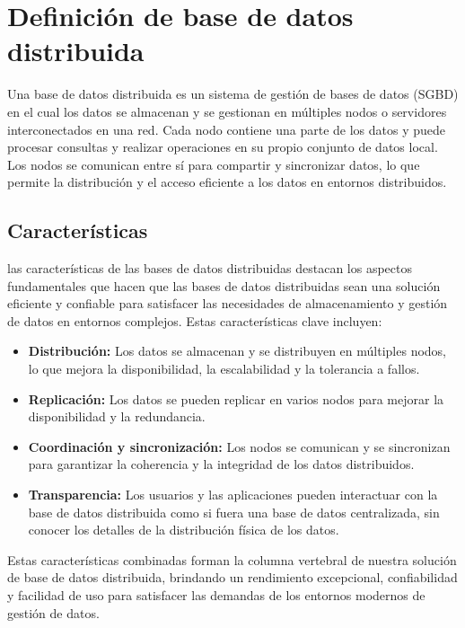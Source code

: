 \section{Definición de base de datos distribuida}
\noindent
Una base de datos distribuida es un sistema de gestión de bases de datos (SGBD) en el cual los datos se almacenan y se gestionan en múltiples nodos o servidores interconectados en una red. Cada nodo contiene una parte de los datos y puede procesar consultas y realizar operaciones en su propio conjunto de datos local. Los nodos se comunican entre sí para compartir y sincronizar datos, lo que permite la distribución y el acceso eficiente a los datos en entornos distribuidos.

\subsection{Características}
\noindent
las características de las bases de datos distribuidas destacan los aspectos fundamentales que hacen que las bases de datos distribuidas sean una solución eficiente y confiable para satisfacer las necesidades de almacenamiento y gestión de datos en entornos complejos. Estas características clave incluyen:

\begin{itemize}
	\item \textbf{Distribución:} Los datos se almacenan y se distribuyen en múltiples nodos, lo que mejora la disponibilidad, la escalabilidad y la tolerancia a fallos.
	\item \textbf{Replicación:} Los datos se pueden replicar en varios nodos para mejorar la disponibilidad y la redundancia.
	\item \textbf{Coordinación y sincronización:} Los nodos se comunican y se sincronizan para garantizar la coherencia y la integridad de los datos distribuidos.
	\item \textbf{Transparencia:} Los usuarios y las aplicaciones pueden interactuar con la base de datos distribuida como si fuera una base de datos centralizada, sin conocer los detalles de la distribución física de los datos.
\end{itemize}
Estas características combinadas forman la columna vertebral de nuestra solución de base de datos distribuida, brindando un rendimiento excepcional, confiabilidad y facilidad de uso para satisfacer las demandas de los entornos modernos de gestión de datos.

